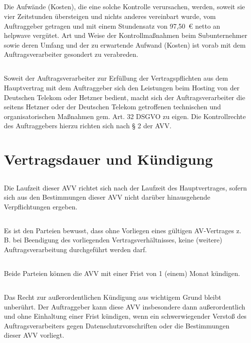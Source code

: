 \documentclass[10pt]{article}
\begin{document}
\subsection{} Die Aufwände (Kosten), die eine solche Kontrolle verursachen, werden, soweit sie
vier Zeitstunden übersteigen und nichts anderes vereinbart wurde, vom
Auftraggeber getragen und mit einem Stundensatz von 97,50 € netto an helpwave
vergütet. Art und Weise der Kontrollmaßnahmen beim Subunternehmer sowie deren
Umfang und der zu erwartende Aufwand (Kosten) ist vorab mit dem
Auftragsverarbeiter gesondert zu verabreden.
\subsection{} Soweit der Auftragsverarbeiter zur Erfüllung der Vertragspflichten aus dem
Hauptvertrag mit dem Auftraggeber sich den Leistungen beim Hosting von der
Deutschen Telekom oder Hetzner bedient, macht sich der Auftragsverarbeiter die
seitens Hetzner oder der Deutschen Telekom getroffenen technischen und
organisatorischen Maßnahmen gem. Art. 32 DSGVO zu eigen. Die Kontrollrechte des
Auftraggebers hierzu richten sich nach § 2 der AVV.

\section{Vertragsdauer und Kündigung}
\subsection{} Die Laufzeit dieser AVV richtet sich nach der Laufzeit des Hauptvertrages, sofern sich
aus den Bestimmungen dieser AVV nicht darüber hinausgehende Verpflichtungen
ergeben.
\subsection{} Es ist den Parteien bewusst, dass ohne Vorliegen eines gültigen AV-Vertrages z. B. bei
Beendigung des vorliegenden Vertragsverhältnisses, keine (weitere)
Auftragsverarbeitung durchgeführt werden darf.
\subsection{} Beide Parteien können die AVV mit einer Frist von 1 (einem) Monat kündigen.
\subsection{} Das Recht zur außerordentlichen Kündigung aus wichtigem Grund bleibt unberührt.
Der Auftraggeber kann diese AVV insbesondere dann außerordentlich und ohne
Einhaltung einer Frist kündigen, wenn ein schwerwiegender Verstoß des
Auftragsverarbeiters gegen Datenschutzvorschriften oder die Bestimmungen dieser
AVV vorliegt.
\end{document}
